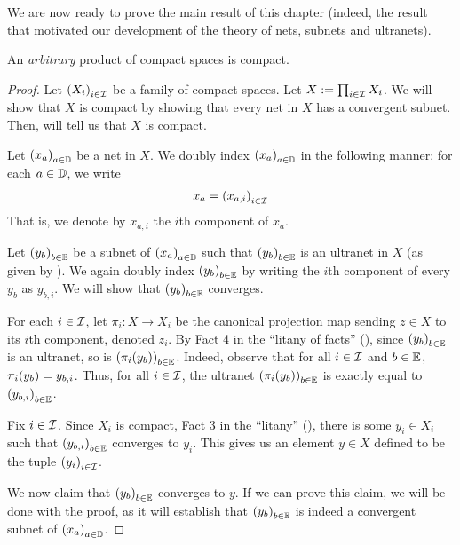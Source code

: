 We are now ready to prove the main result of this chapter (indeed, the result that motivated our development of the theory of nets, subnets and ultranets).

\begin{boxtheorem}
    An \textit{arbitrary} product of compact spaces is compact.
\end{boxtheorem}
\begin{proof}
    Let $\left( X_i \right)_{i \in \mathcal{I}}$ be a family of compact spaces. Let $X := \prod_{i \in \mathcal{I}} X_i$. We will show that $X$ is compact by showing that every net in $X$ has a convergent subnet. Then, \sorry{} will tell us that $X$ is compact.

    Let $\left( x_a \right)_{a \in \mathbb{D}}$ be a net in $X$. We doubly index $\left( x_a \right)_{a \in \mathbb{D}}$ in the following manner: for each $a \in \mathbb{D}$, we write
    \begin{align*}
        x_a = \left( x_{a, i} \right)_{i \in \mathcal{I}}
    \end{align*}
    That is, we denote by $x_{a, i}$ the $i$th component of $x_a$.
    
    Let $\left( y_b \right)_{b \in \mathbb{E}}$ be a subnet of $\left( x_a \right)_{a \in \mathbb{D}}$ such that $\left( y_b \right)_{b \in \mathbb{E}}$ is an ultranet in $X$ (as given by ). We again doubly index $\left( y_b \right)_{b \in \mathbb{E}}$ by writing the $i$th component of every $y_b$ as $y_{b, i}$. We will show that $\left( y_b \right)_{b \in \mathbb{E}}$ converges.

    For each $i \in \mathcal{I}$, let $\pi_i : X \to X_i$ be the canonical projection map sending $z \in X$ to its $i$th component, denoted $z_i$. By Fact 4 in the ``litany of facts'' (), since $\left( y_b \right)_{b \in \mathbb{E}}$ is an ultranet, so is $\left( \pi_i\!\left( y_b \right) \right)_{b \in \mathbb{E}}$. Indeed, observe that for all $i \in \mathcal{I}$ and $b \in \mathbb{E}$, $\pi_i\!\left( y_b \right) = y_{b, i}$. Thus, for all $i \in \mathcal{I}$, the ultranet $\left( \pi_i\!\left( y_b \right) \right)_{b \in \mathbb{E}}$ is exactly equal to $\left( y_{b, i} \right)_{b \in \mathbb{E}}$.

    Fix $i \in \mathcal{I}$. Since $X_i$ is compact, Fact 3 in the ``litany'' (), there is some $y_i \in X_i$ such that $\left( y_{b, i} \right)_{b \in \mathbb{E}}$ converges to $y_i$. This gives us an element $y \in X$ defined to be the tuple $\left( y_i \right)_{i \in \mathcal{I}}$.

    We now claim that $\left( y_b \right)_{b \in \mathbb{E}}$ converges to $y$. If we can prove this claim, we will be done with the proof, as it will establish that $\left( y_b \right)_{b \in \mathbb{E}}$ is indeed a convergent subnet of $\left( x_a \right)_{a \in \mathbb{D}}$.


\end{proof}
